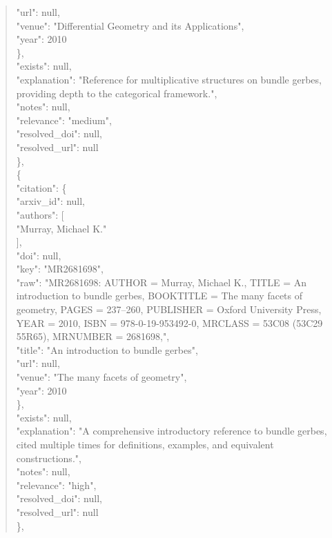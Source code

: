 \documentclass[11pt]{article}
\begin{document}
\begin{quote}
        "url": null,\\
        "venue": "Differential Geometry and its Applications",\\
        "year": 2010\\
      \},\\
      "exists": null,\\
      "explanation": "Reference for multiplicative structures on bundle gerbes, providing depth to the categorical framework.",\\
      "notes": null,\\
      "relevance": "medium",\\
      "resolved\_doi": null,\\
      "resolved\_url": null\\
    \},\\
    \{\\
      "citation": \{\\
        "arxiv\_id": null,\\
        "authors": [\\
          "Murray, Michael K."\\
        ],\\
        "doi": null,\\
        "key": "MR2681698",\\
        "raw": "MR2681698: AUTHOR = Murray, Michael K., TITLE = An introduction to bundle gerbes, BOOKTITLE = The many facets of geometry, PAGES = 237--260, PUBLISHER = Oxford University Press, YEAR = 2010, ISBN = 978-0-19-953492-0, MRCLASS = 53C08 (53C29 55R65), MRNUMBER = 2681698,",\\
        "title": "An introduction to bundle gerbes",\\
        "url": null,\\
        "venue": "The many facets of geometry",\\
        "year": 2010\\
      \},\\
      "exists": null,\\
      "explanation": "A comprehensive introductory reference to bundle gerbes, cited multiple times for definitions, examples, and equivalent constructions.",\\
      "notes": null,\\
      "relevance": "high",\\
      "resolved\_doi": null,\\
      "resolved\_url": null\\
    \},\\

\end{quote}
\end{document}
